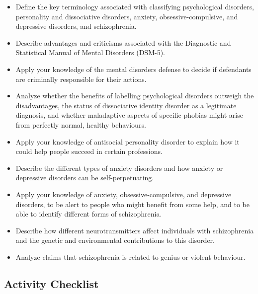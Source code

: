 \documentclass[
]{book}
\providecommand{\tightlist}{%
  \setlength{\itemsep}{0pt}\setlength{\parskip}{0pt}}
\begin{document}
\begin{itemize}
\tightlist
\item
  Define the key terminology associated with classifying psychological disorders, personality and dissociative disorders, anxiety, obsessive-compulsive, and depressive disorders, and schizophrenia.\\
\item
  Describe advantages and criticisms associated with the Diagnostic and Statistical Manual of Mental Disorders (DSM-5).\\
\item
  Apply your knowledge of the mental disorders defense to decide if defendants are criminally responsible for their actions.\\
\item
  Analyze whether the benefits of labelling psychological disorders outweigh the disadvantages, the status of dissociative identity disorder as a legitimate diagnosis, and whether maladaptive aspects of specific phobias might arise from perfectly normal, healthy behaviours.\\
\item
  Apply your knowledge of antisocial personality disorder to explain how it could help people succeed in certain professions.\\
\item
  Describe the different types of anxiety disorders and how anxiety or depressive disorders can be self-perpetuating.\\
\item
  Apply your knowledge of anxiety, obsessive-compulsive, and depressive disorders, to be alert to people who might benefit from some help, and to be able to identify different forms of schizophrenia.\\
\item
  Describe how different neurotransmitters affect individuals with schizophrenia and the genetic and environmental contributions to this disorder.
\item
  Analyze claims that schizophrenia is related to genius or violent behaviour.
\end{itemize}

\hypertarget{activity-checklist-9}{%
\subsection*{Activity Checklist}\label{activity-checklist-9}}
\end{document}
